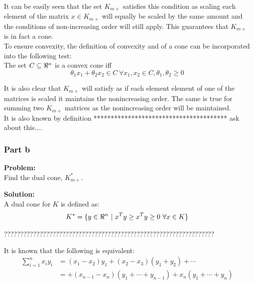 \documentclass[letter]{article}
\begin{document}
It can be easily seen that the set $K_{m+}$ satisfies this condition as scaling each element of the matrix $x \in K_{m+}$ will equally be scaled by the same amount and the conditions of non-increasing order will still apply. This guarantees that $K_{m+}$ is in fact a cone.\\

To ensure convexity, the definition of convexity and of a cone can be incorporated into the following test:\\
The set $C \subseteq \real^n$ is a convex cone iff
\begin{equation}
	\theta_1 x_1 + \theta_2 x_2 \in C \ \forall x_1,x_2 \in C, \theta_1, \theta_2 \geq 0
\end{equation}

It is also clear that $K_{m+}$ will satisfy as if each element element of one of the matrices is scaled it maintains the nonincreasing order. The same is true for summing two $K_{m+}$ matrices as the nonincreasing order will be maintained.\\

It is also known by definition
***************************************
ask about this....


\subsubsection{Part b}
\textbf{Problem:}\\
Find the dual cone, $K_{m+}^*$.

\noindent
\textbf{Solution:}\\
A dual cone for $K$ is defined as:
\begin{equation}
	K^* = \{y \in \real^n \ | \ x^Ty \geq x^T y \geq 0 \ \forall x \in K\}
\end{equation}




?????????????????????????????????????????????????????????????????

It is known that the following is equivalent:
\begin{equation}
	\begin{aligned}
		\sum_{i=1}^{n} x_i y_i &= (x_1 - x_2) y_1 + (x_2 - x_3) (y_1 + y_2) + \cdots \\
						&= + (x_{n-1} - x_n) (y_1 + \cdots + y_{n-1}) + x_n (y_1 + \cdots + y_n)
	\end{aligned}
\end{equation}
\end{document}
